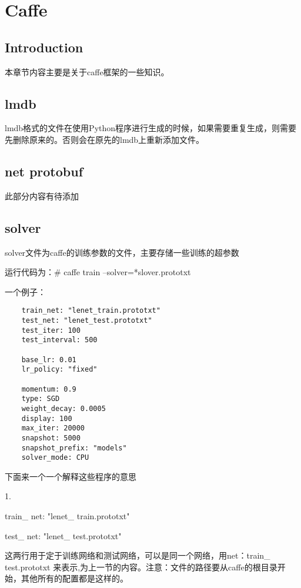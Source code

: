 \chapter{Caffe}

\section*{Introduction}
	本章节内容主要是关于caffe框架的一些知识。
	

\section{lmdb}
	lmdb格式的文件在使用Python程序进行生成的时候，如果需要重复生成，则需要先删除原来的。否则会在原先的lmdb上重新添加文件。


	
\section{net protobuf}
	\boldmath  %
	此部分内容有待添加
	
	

\section{solver}	
	solver文件为caffe的训练参数的文件，主要存储一些训练的超参数
    
    运行代码为：# caffe train --solver=*slover.prototxt
    
    一个例子：
    
    \begin{lstlisting}
    train_net: "lenet_train.prototxt"
    test_net: "lenet_test.prototxt"	
	test_iter: 100
	test_interval: 500
	
	base_lr: 0.01
	lr_policy: "fixed"
	
	momentum: 0.9
	type: SGD
	weight_decay: 0.0005
	display: 100
	max_iter: 20000
	snapshot: 5000
	snapshot_prefix: "models"
	solver_mode: CPU
	\end{lstlisting}
	
	下面来一个一个解释这些程序的意思
    
    1.    
        
    train\_ net: "lenet\_ train.prototxt"
    
    test\_ net: "lenet\_ test.prototxt"
    	
    这两行用于定于训练网络和测试网络，可以是同一个网络，用net：train\_ test.prototxt 来表示,为上一节的内容。注意：文件的路径要从caffe的根目录开始，其他所有的配置都是这样的。
    

